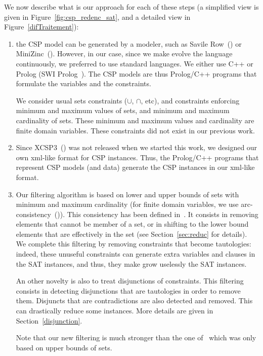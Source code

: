\documentclass[3p,authoryear,times]{elsarticle}
\begin{document}
 We now describe what is our approach for each of these steps (a simplified view is given in Figure~\ref{fig:csp_redenc_sat}, and a detailed view in Figure~\ref{difTraitement}): 
\begin{enumerate}
\item the CSP model can be generated by a modeler, such as Savile Row~(\cite{SavileRow}) or MiniZinc~(\cite{minizinc}). However, in our case, since we make evolve the language continuously, we preferred to use standard languages. We either use C++ or Prolog (SWI Prolog~\cite{SWI}). The CSP models are thus Prolog/C++ programs that formulate the variables and the constraints. 

We consider usual sets constraints ($\cup$, $\cap$, etc), and constraints enforcing minimum and maximum values of sets, and minimum and maximum cardinality of sets. These minimum and maximum values and cardinality are finite domain variables. These constraints did not exist in our previous work.

\item Since XCSP3~(\cite{xcsp3}) was not released when we started this work, we designed our own xml-like format for CSP instances. Thus, the Prolog/C++ programs that represent CSP models  (and data) generate the CSP instances in our xml-like format.

\item Our filtering algorithm is based on lower and upper bounds of sets with minimum and maximum cardinality (for finite domain variables, we use arc-consistency~(\cite{gac})). This consistency has been defined in~\cite{azevedoThesis}. It consists in removing elements that cannot be member of a set, or in shifting to the lower bound elements that are effectively in the set (see Section~\ref{sec:reduc} for details). We complete this filtering by removing constraints that become tautologies: indeed, these unuseful constraints can generate extra variables and clauses in the SAT instances, and thus, they make grow uselessly the SAT instances.  

An other novelty is also to treat disjunctions of constraints. This filtering consists in detecting disjunctions that are tautologies in order to remove them. Disjuncts that are contradictions are also detected and removed. This can drastically reduce some instances. More details are given in Section~\ref{disjunction}.

Note that our new filtering is much stronger than the one of~\cite{aisc2014} which was only based on upper bounds of sets.


\end{enumerate}
\end{document}
